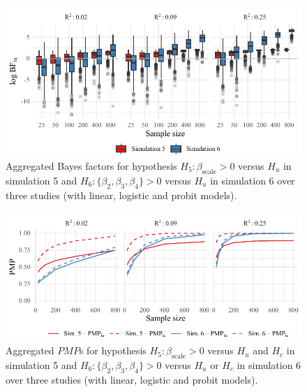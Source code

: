 \documentclass[
]{interact}
\begin{document}
\begin{figure}[!t]

{\centering \includegraphics[width=1\textwidth,height=\textheight]{manuscript_VK_files/figure-pdf/fig-BF56-1.pdf}

}

\caption{\label{fig-BF56}Aggregated Bayes factors for hypothesis
\(H_5: \beta_{\text{scale}} > 0\) versus \(H_u\) in simulation 5 and
\(H_6: \{\beta_2, \beta_3, \beta_4\} > 0\) versus \(H_u\) in simulation
6 over three studies (with linear, logistic and probit models).}

\end{figure}

\begin{figure}[!t]

{\centering \includegraphics[width=1\textwidth,height=\textheight]{manuscript_VK_files/figure-pdf/fig-PMP56-1.pdf}

}

\caption{\label{fig-PMP56}Aggregated \(PMP\)s for hypothesis
\(H_5: \beta_{\text{scale}} > 0\) versus \(H_u\) and \(H_c\) in
simulation 5 and \(H_6: \{\beta_2, \beta_3, \beta_4\} > 0\) versus
\(H_u\) or \(H_c\) in simulation 6 over three studies (with linear,
logistic and probit models).}

\end{figure}
\end{document}
